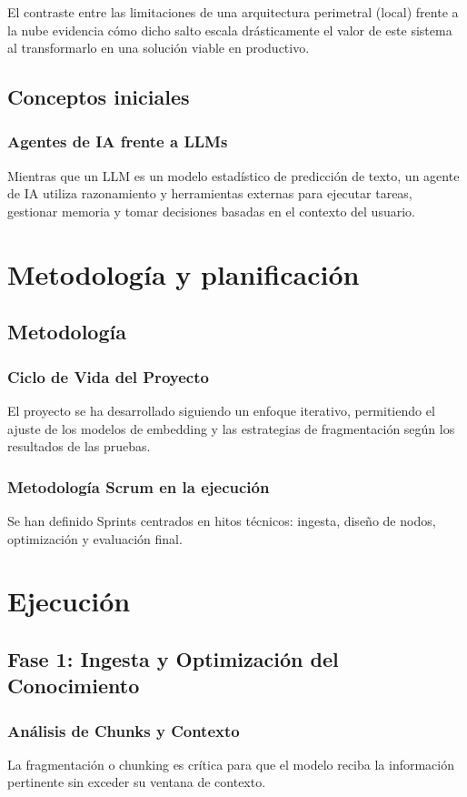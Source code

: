 \documentclass[12pt,a4paper,oneside]{report}
\begin{document}
El contraste entre las limitaciones de una arquitectura perimetral (local) frente a la nube evidencia cómo dicho salto escala drásticamente el valor de este sistema al transformarlo en una solución viable en productivo.


\chapter{Conceptos iniciales}
\section{Agentes de IA frente a LLMs}
Mientras que un LLM es un modelo estadístico de predicción de texto, un agente de IA utiliza razonamiento y herramientas externas para ejecutar tareas, gestionar memoria y tomar decisiones basadas en el contexto del usuario.

\part{Metodología y planificación}

\chapter{Metodología}
\section{Ciclo de Vida del Proyecto}
El proyecto se ha desarrollado siguiendo un enfoque iterativo, permitiendo el ajuste de los modelos de embedding y las estrategias de fragmentación según los resultados de las pruebas.

\section{Metodología Scrum en la ejecución}
Se han definido Sprints centrados en hitos técnicos: ingesta, diseño de nodos, optimización y evaluación final.

\part{Ejecución}

\chapter{Fase 1: Ingesta y Optimización del Conocimiento}
\section{Análisis de Chunks y Contexto}
La fragmentación o chunking es crítica para que el modelo reciba la información pertinente sin exceder su ventana de contexto.
\end{document}
